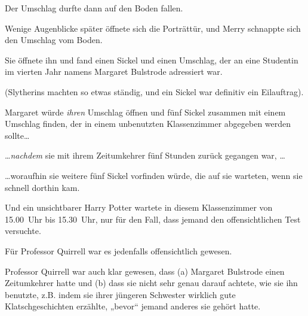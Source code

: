 Der Umschlag durfte dann auf den Boden fallen.

Wenige Augenblicke später öffnete sich die Porträttür, und Merry schnappte sich den Umschlag vom Boden.

Sie öffnete ihn und fand einen Sickel und einen Umschlag, der an eine Studentin im vierten Jahr namens Margaret Bulstrode adressiert war.

(Slytherins machten so etwas ständig, und ein Sickel war definitiv ein Eilauftrag).

Margaret würde \emph{ihren} Umschlag öffnen und fünf Sickel zusammen mit einem Umschlag finden, der in einem unbenutzten Klassenzimmer abgegeben werden sollte…

…\emph{nachdem} sie mit ihrem Zeitumkehrer fünf Stunden zurück gegangen war, …

…woraufhin sie weitere fünf Sickel vorfinden würde, die auf sie warteten, wenn sie schnell dorthin kam.

Und ein unsichtbarer Harry Potter wartete in diesem Klassenzimmer von 15.00~Uhr bis 15.30~Uhr, nur für den Fall, dass jemand den offensichtlichen Test versuchte.

Für Professor Quirrell war es jedenfalls offensichtlich gewesen.

Professor Quirrell war auch klar gewesen, dass (a) Margaret Bulstrode einen Zeitumkehrer hatte und (b) dass sie nicht sehr genau darauf achtete, wie sie ihn benutzte, z.B. indem sie ihrer jüngeren Schwester wirklich gute Klatschgeschichten erzählte, „bevor“ jemand anderes sie gehört hatte.

